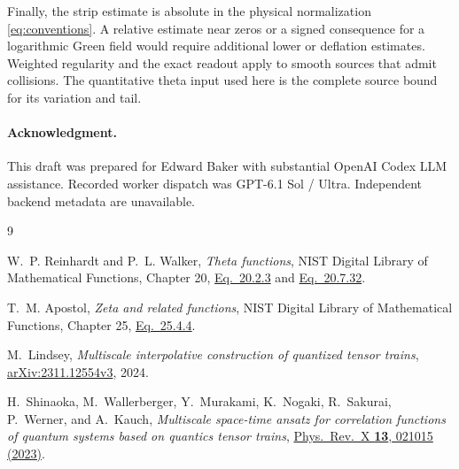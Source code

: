 \documentclass[11pt]{article}
\begin{document}
Finally, the strip estimate is absolute in the physical
normalization \eqref{eq:conventions}. A relative estimate near
zeros or a signed consequence for a logarithmic Green field
would require additional lower or deflation estimates. Weighted
regularity and the exact readout apply to smooth sources that
admit collisions. The quantitative theta input used here is
the complete source bound for its variation and tail.

\paragraph{Acknowledgment.} This draft was prepared for Edward Baker with substantial
OpenAI Codex LLM assistance. Recorded worker dispatch was GPT-6.1 Sol /
Ultra. Independent backend metadata are unavailable.

\begin{thebibliography}{9}

W.~P. Reinhardt and P.~L. Walker,
\emph{Theta functions}, NIST Digital Library of Mathematical Functions,
Chapter 20, \href{https://dlmf.nist.gov/20.2#E3}{Eq.~20.2.3} and
\href{https://dlmf.nist.gov/20.7#E32}{Eq.~20.7.32}.

T.~M. Apostol, \emph{Zeta and related functions},
NIST Digital Library of Mathematical Functions, Chapter 25,
\href{https://dlmf.nist.gov/25.4#E4}{Eq.~25.4.4}.

M.~Lindsey, \emph{Multiscale interpolative construction of quantized
tensor trains}, \href{https://arxiv.org/abs/2311.12554v3}{arXiv:2311.12554v3},
2024.

H.~Shinaoka, M.~Wallerberger, Y.~Murakami, K.~Nogaki, R.~Sakurai,
P.~Werner, and A.~Kauch, \emph{Multiscale space-time ansatz for
correlation functions of quantum systems based on quantics tensor
trains}, \href{https://doi.org/10.1103/PhysRevX.13.021015}
{Phys.\ Rev.\ X \textbf{13}, 021015 (2023)}.

\end{thebibliography}
\end{document}
